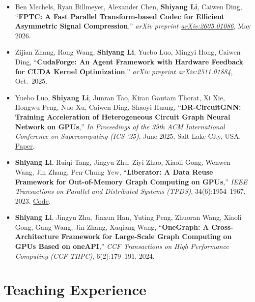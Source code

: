 \documentclass[a4paper,10pt]{article}
\newcommand{\faChevronRight}{\textbullet}
\newcommand{\faChalkboardTeacher}{}
\begin{document}
\begin{itemize}[leftmargin=1.2em, label=\textcolor{sectioncolor}{\small\faChevronRight}, itemsep=3pt]
  \item Ben Mechels, Ryan Billmeyer, Alexander Chen, \textbf{Shiyang Li}, Caiwen Ding, ``\textbf{FPTC: A Fast Parallel Transform-based Codec for Efficient Asymmetric Signal Compression},'' \textit{arXiv preprint \href{https://arxiv.org/abs/2605.01086}{arXiv:2605.01086}}, May 2026.

  \item Zijian Zhang, Rong Wang, \textbf{Shiyang Li}, Yuebo Luo, Mingyi Hong, Caiwen Ding, ``\textbf{CudaForge: An Agent Framework with Hardware Feedback for CUDA Kernel Optimization},'' \textit{arXiv preprint \href{https://arxiv.org/abs/2511.01884}{arXiv:2511.01884}}, Oct.\ 2025.

  \item Yuebo Luo, \textbf{Shiyang Li}, Junran Tao, Kiran Gautam Thorat, Xi Xie, Hongwu Peng, Nuo Xu, Caiwen Ding, Shaoyi Huang, ``\textbf{DR-CircuitGNN: Training Acceleration of Heterogeneous Circuit Graph Neural Network on GPUs},'' \textit{In Proceedings of the 39th ACM International Conference on Supercomputing (ICS '25)}, June 2025, Salt Lake City, USA. \href{https://hpcrl.github.io/ICS2025-webpage/program/Proceedings_ICS25/ics25-76.pdf}{Paper}.

  \item \textbf{Shiyang Li}, Ruiqi Tang, Jingyu Zhu, Ziyi Zhao, Xiaoli Gong, Wenwen Wang, Jin Zhang, Pen-Chung Yew, ``\textbf{Liberator: A Data Reuse Framework for Out-of-Memory Graph Computing on GPUs},'' \textit{IEEE Transactions on Parallel and Distributed Systems (TPDS)}, 34(6):1954--1967, 2023. \href{https://github.com/NKU-Yang/Liberator}{Code}.

  \item \textbf{Shiyang Li}, Jingyu Zhu, Jiaxun Han, Yuting Peng, Zhuoran Wang, Xiaoli Gong, Gang Wang, Jin Zhang, Xuqiang Wang, ``\textbf{OneGraph: A Cross-Architecture Framework for Large-Scale Graph Computing on GPUs Based on oneAPI},'' \textit{CCF Transactions on High Performance Computing (CCF-THPC)}, 6(2):179--191, 2024.

\end{itemize}

\section{\texorpdfstring{\faChalkboardTeacher\hspace{6pt}}{}Teaching Experience}
\end{document}
